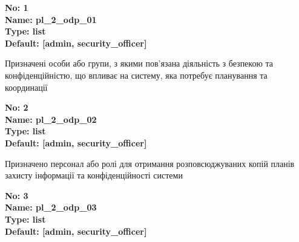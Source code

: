 \documentclass{article}
\begin{document}
\vspace{10pt}
{\footnotesize\bfseries
No: 1\\
Name: pl\_\allowbreak{}2\_\allowbreak{}odp\_\allowbreak{}01\\
Type: list\\
Default: [\textquotedbl{}admin\textquotedbl{}, \textquotedbl{}security\_\allowbreak{}officer\textquotedbl{}]
}

{\footnotesize Призначені особи або групи, з якими пов'язана діяльність з безпекою та конфіденційністю, що впливає на систему, яка потребує планування та координації}


{\footnotesize\bfseries
No: 2\\
Name: pl\_\allowbreak{}2\_\allowbreak{}odp\_\allowbreak{}02\\
Type: list\\
Default: [\textquotedbl{}admin\textquotedbl{}, \textquotedbl{}security\_\allowbreak{}officer\textquotedbl{}]
}

{\footnotesize Призначено персонал або ролі для отримання розповсюджуваних копій планів захисту інформації та конфіденційності системи}


{\footnotesize\bfseries
No: 3\\
Name: pl\_\allowbreak{}2\_\allowbreak{}odp\_\allowbreak{}03\\
Type: list\\
Default: [\textquotedbl{}admin\textquotedbl{}, \textquotedbl{}security\_\allowbreak{}officer\textquotedbl{}]
}
\end{document}
